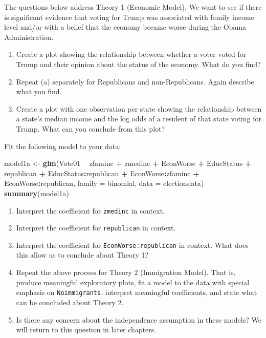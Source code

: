 \documentclass[
]{krantz}
\newenvironment{Shaded}{\begin{snugshade}}{\end{snugshade}}
\newcommand{\DataTypeTok}[1]{\textcolor[rgb]{0.27,0.27,0.27}{#1}}
\newcommand{\KeywordTok}[1]{\textcolor[rgb]{0.27,0.27,0.27}{\textbf{#1}}}
\newcommand{\NormalTok}[1]{#1}
\newcommand{\OperatorTok}[1]{\textcolor[rgb]{0.43,0.43,0.43}{\textbf{#1}}}
\newcommand{\StringTok}[1]{\textcolor[rgb]{0.5,0.5,0.5}{#1}}
\providecommand{\tightlist}{%
  \setlength{\itemsep}{0pt}\setlength{\parskip}{0pt}}
\begin{document}
The questions below address Theory 1 (Economic Model). We want to see if there is significant evidence that voting for Trump was associated with family income level and/or with a belief that the economy became worse during the Obama Administration.

\begin{enumerate}
\def\labelenumi{\alph{enumi}.}
\tightlist
\item
  Create a plot showing the relationship between whether a voter voted for Trump and their opinion about the status of the economy. What do you find?
\item
  Repeat (a) separately for Republicans and non-Republicans. Again describe what you find.
\item
  Create a plot with one observation per state showing the relationship between a state's median income and the log odds of a resident of that state voting for Trump. What can you conclude from this plot?
\end{enumerate}

Fit the following model to your data:

\begin{Shaded}
\begin{Highlighting}[]
\NormalTok{model1a <-}\StringTok{ }\KeywordTok{glm}\NormalTok{(Vote01 }\OperatorTok{~}\StringTok{ }\NormalTok{zfaminc }\OperatorTok{+}\StringTok{ }\NormalTok{zmedinc }\OperatorTok{+}\StringTok{ }\NormalTok{EconWorse }\OperatorTok{+}\StringTok{ }\NormalTok{EducStatus }\OperatorTok{+}
\StringTok{  }\NormalTok{republican }\OperatorTok{+}\StringTok{ }\NormalTok{EducStatus}\OperatorTok{:}\NormalTok{republican }\OperatorTok{+}\StringTok{ }\NormalTok{EconWorse}\OperatorTok{:}\NormalTok{zfaminc }\OperatorTok{+}\StringTok{ }
\StringTok{  }\NormalTok{EconWorse}\OperatorTok{:}\NormalTok{republican, }\DataTypeTok{family =}\NormalTok{ binomial, }\DataTypeTok{data =}\NormalTok{ electiondata)}
\KeywordTok{summary}\NormalTok{(model1a)}
\end{Highlighting}
\end{Shaded}

\begin{enumerate}
\def\labelenumi{\alph{enumi}.}
\setcounter{enumi}{3}
\tightlist
\item
  Interpret the coefficient for \texttt{zmedinc} in context.
\item
  Interpret the coefficient for \texttt{republican} in context.
\item
  Interpret the coefficient for \texttt{EconWorse:republican} in context. What does this allow us to conclude about Theory 1?
\item
  Repeat the above process for Theory 2 (Immigration Model). That is, produce meaningful exploratory plots, fit a model to the data with special emphasis on \texttt{Noimmigrants}, interpret meaningful coefficients, and state what can be concluded about Theory 2.
\item
  Is there any concern about the independence assumption in these models? We will return to this question in later chapters.
\end{enumerate}
\end{document}
